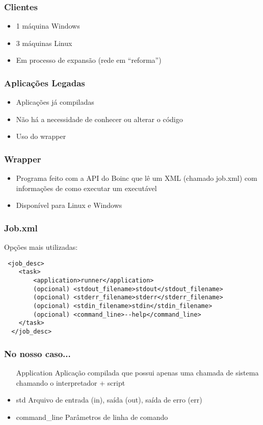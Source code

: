 \documentclass{beamer}
\begin{document}
\begin{frame}
  \frametitle{Clientes}
  \begin{itemize}
    \item 1 máquina Windows
    \item 3 máquinas Linux
    \item Em processo de expansão (rede em ``reforma'')
  \end{itemize}
\end{frame}

\begin{frame}
  \frametitle{Aplicações Legadas}
  \begin{itemize}
    \item Aplicações já compiladas
    \item Não há a necessidade de conhecer ou alterar o código
    \item Uso do wrapper
  \end{itemize}
\end{frame}

\begin{frame}[fragile]
  \frametitle{Wrapper}
  \begin{itemize}
    \item Programa feito com a API do Boinc que lê um XML (chamado job.xml)  com informações de como executar um executável
    \item Disponível para Linux e Windows
  \end{itemize}
\end{frame}

\begin{frame}[fragile]
  \frametitle{Job.xml}
  Opções mais utilizadas:
 \begin{verbatim}
 <job_desc>
    <task>
        <application>runner</application>
        (opcional) <stdout_filename>stdout</stdout_filename>
        (opcional) <stderr_filename>stderr</stderr_filename>
        (opcional) <stdin_filename>stdin</stdin_filename> 
        (opcional) <command_line>--help</command_line>
    </task>
  </job_desc>
  \end{verbatim}
\end{frame}



\begin{frame}
  \frametitle{No nosso caso...}
  \begin{itemize}
    \item[Application] Aplicação compilada que possui apenas uma chamada de sistema chamando o interpretador + script
    \item{std\*} Arquivo de entrada (in), saída (out), saída de erro (err)
    \item{command_line} Parâmetros de linha de comando
  \end{itemize}
\end{frame}
\end{document}
